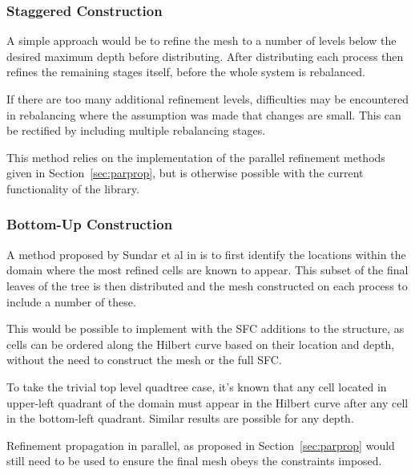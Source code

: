 \documentclass[twoside]{IIBproject}
\numberwithin{figure}{section}
\begin{document}
        \subsubsection{Staggered Construction}
            \label{sec:parainit-staggered}

            A simple approach would be to refine the mesh to a number of levels below the desired maximum depth before distributing. After distributing each process then refines the remaining stages itself, before the whole system is rebalanced. 

            If there are too many additional refinement levels, difficulties may be encountered in rebalancing where the assumption was made that changes are small. This can be rectified by including multiple rebalancing stages.

            This method relies on the implementation of the parallel refinement methods given in Section~\ref{sec:parprop}, but is otherwise possible with the current functionality of the library. 



        \subsubsection{Bottom-Up Construction}
            \label{sec:parainit-bottomup}

            A method proposed by Sundar et al in \cite{sundar2008} is to first identify the locations within the domain where the most refined cells are known to appear. This subset of the final leaves of the tree is then distributed and the mesh constructed on each process to include a number of these. 

            This would be possible to implement with the SFC additions to the structure, as cells can be ordered along the Hilbert curve based on their location and depth, without the need to construct the mesh or the full SFC.

            To take the trivial top level quadtree case, it's known that any cell located in upper-left quadrant of the domain must appear in the Hilbert curve after any cell in the bottom-left quadrant. Similar results are possible for any depth. 

            Refinement propagation in parallel, as proposed in Section~\ref{sec:parprop} would still need to be used to ensure the final mesh obeys the constraints imposed. 
 
\end{document}
